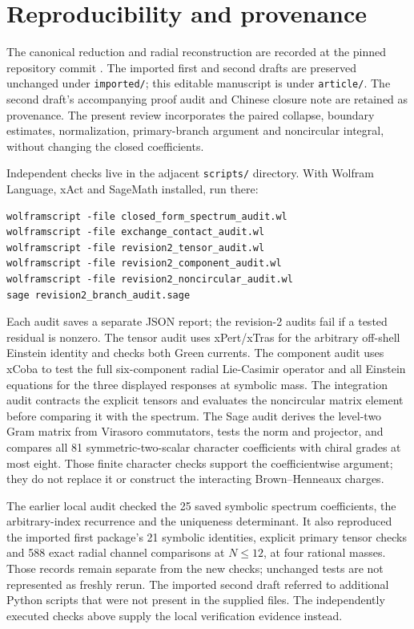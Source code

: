 \documentclass[11pt,a4paper]{article}
\numberwithin{equation}{section}
\theoremstyle{remark}\newtheorem{remark}[theorem]{Remark}
\begin{document}
\section{Reproducibility and provenance}

The canonical reduction and radial reconstruction are recorded at the pinned repository commit \cite{notes}. The imported first and second drafts are preserved unchanged under \texttt{imported/}; this editable manuscript is under \texttt{article/}. The second draft's accompanying proof audit and Chinese closure note are retained as provenance. The present review incorporates the paired collapse, boundary estimates, normalization, primary-branch argument and noncircular integral, without changing the closed coefficients.

Independent checks live in the adjacent \texttt{scripts/} directory. With Wolfram Language, xAct and SageMath installed, run there:
\begin{verbatim}
wolframscript -file closed_form_spectrum_audit.wl
wolframscript -file exchange_contact_audit.wl
wolframscript -file revision2_tensor_audit.wl
wolframscript -file revision2_component_audit.wl
wolframscript -file revision2_noncircular_audit.wl
sage revision2_branch_audit.sage
\end{verbatim}
Each audit saves a separate JSON report; the revision-2 audits fail if a tested residual is nonzero. The tensor audit uses xPert/xTras for the arbitrary off-shell Einstein identity and checks both Green currents. The component audit uses xCoba to test the full six-component radial Lie-Casimir operator and all Einstein equations for the three displayed responses at symbolic mass. The integration audit contracts the explicit tensors and evaluates the noncircular matrix element before comparing it with the spectrum. The Sage audit derives the level-two Gram matrix from Virasoro commutators, tests the norm and projector, and compares all 81 symmetric-two-scalar character coefficients with chiral grades at most eight. Those finite character checks support the coefficientwise argument; they do not replace it or construct the interacting Brown--Henneaux charges.

The earlier local audit checked the 25 saved symbolic spectrum coefficients, the arbitrary-index recurrence and the uniqueness determinant. It also reproduced the imported first package's 21 symbolic identities, explicit primary tensor checks and 588 exact radial channel comparisons at $N\leq12$, at four rational masses. Those records remain separate from the new checks; unchanged tests are not represented as freshly rerun. The imported second draft referred to additional Python scripts that were not present in the supplied files. The independently executed checks above supply the local verification evidence instead.
\end{document}
